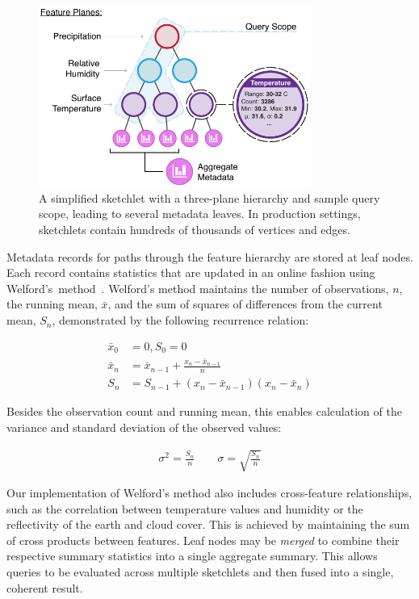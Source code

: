 \begin{figure}[b!]
    \centerline{\includegraphics[width=3.5in]{figures/sketch.pdf}}
    \caption{A simplified sketchlet with a three-plane hierarchy and sample query scope, leading to several metadata leaves. In production settings, sketchlets contain hundreds of thousands of vertices and edges.}
    \label{fig:sketch}
\end{figure}

Metadata records for paths through the feature hierarchy are stored at leaf nodes. Each record contains statistics that are updated in an online fashion using Welford's~method~\cite{welford1962note}. Welford's method maintains the number of observations, $n$, the running mean, $\bar{x}$, and the sum of squares of differences from the current mean, $S_n$, demonstrated by the following recurrence relation:

\begin{align*}
    \bar{x}_0 &= 0, S_0 = 0 \\
    \bar{x}_n &= \bar{x}_{n - 1} + \frac{x_n - \bar{x}_{n - 1}}{n} \\
    S_n       &= S_{n - 1} + (x_n - \bar{x}_{n - 1})(x_n - \bar{x}_n)
\end{align*}

Besides the observation count and running mean, this enables calculation of the variance and standard deviation of the observed values:

\begin{align*}
    \sigma^2 = \frac{S_n}{n} \hspace{2em} \sigma = \sqrt{\frac{S_n}{n}}
\end{align*}

Our implementation of Welford's method also includes cross-feature relationships, such as the correlation between temperature values and humidity or the reflectivity of the earth and cloud cover. This is achieved by maintaining the sum of cross products between features. Leaf nodes may be \emph{merged} to combine their respective summary statistics into a single aggregate summary. This allows queries to be evaluated across multiple sketchlets and then fused into a single, coherent result.


